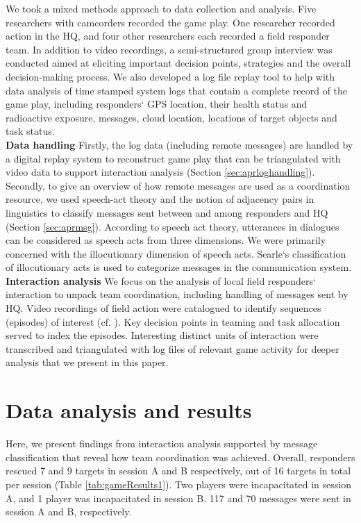 We took a mixed methods approach to data collection and analysis. Five researchers with camcorders recorded the game play. One researcher recorded action in the HQ, and four other researchers each recorded a field responder team. In addition to video recordings, a semi-structured group interview was conducted aimed at eliciting important decision points, strategies and the overall decision-making process. We also developed a log file replay tool to help with data analysis of time stamped system logs that contain a complete record of the game play, including responders` GPS location, their health status and radioactive exposure, messages, cloud location, locations of target objects and task status. \\

\textbf{Data handling} Firstly, the log data (including remote messages) are handled by a digital replay system to reconstruct game play that can be triangulated with video data to support interaction analysis (Section \ref{sec:aprloghandling}). Secondly, to give an overview of how remote messages are used as a coordination resource, we used speech-act theory and the notion of adjacency pairs in linguistics to classify messages sent between and among responders and HQ (Section \ref{sec:aprmsg}). According to speech act theory, utterances in dialogues can be considered as speech acts from three dimensions. We were primarily concerned with the illocutionary dimension of speech acts. Searle`s classification of illocutionary acts \cite{Searle1976} is used to categorize messages in the communication system.\\

\textbf{Interaction analysis} We focus on the analysis of local field responders` interaction to unpack team coordination, including handling of messages sent by HQ. Video recordings of field action were catalogued to identify sequences (episodes) of interest (cf. \cite{Heath2010}). Key decision points in teaming and task allocation served to index the episodes. Interesting distinct units of interaction were transcribed and triangulated with log files of relevant game activity for deeper analysis that we present in this paper.\\




\section{Data analysis and results}
Here, we present findings from interaction analysis supported by message classification that reveal how team coordination was achieved. Overall, responders rescued 7 and 9 targets in session A and B respectively, out of 16 targets in total per session (Table \ref{tab:gameResults1}). Two players were incapacitated in session A, and 1 player was incapacitated in session B. 117 and 70 messages were sent in session A and B, respectively.\\


